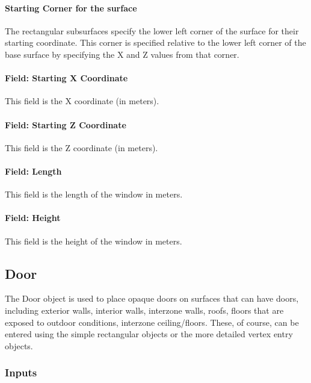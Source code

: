 \paragraph{Starting Corner for the surface}\label{starting-corner-for-the-surface-10}

The rectangular subsurfaces specify the lower left corner of the surface for their starting coordinate. This corner is specified relative to the lower left corner of the base surface by specifying the X and Z values from that corner.

\paragraph{Field: Starting X Coordinate}\label{field-starting-x-coordinate-10}

This field is the X coordinate (in meters).

\paragraph{Field: Starting Z Coordinate}\label{field-starting-z-coordinate-10}

This field is the Z coordinate (in meters).

\paragraph{Field: Length}\label{field-length-10}

This field is the length of the window in meters.

\paragraph{Field: Height}\label{field-height-4}

This field is the height of the window in meters.

\subsection{Door}\label{door}

The Door object is used to place opaque doors on surfaces that can have doors, including exterior walls, interior walls, interzone walls, roofs, floors that are exposed to outdoor conditions, interzone ceiling/floors. These, of course, can be entered using the simple rectangular objects or the more detailed vertex entry objects.

\subsubsection{Inputs}\label{inputs-15-016}


